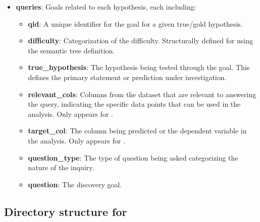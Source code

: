 \begin{itemize}
    \item \textbf{queries}: Goals related to each hypothesis, each including:
    \begin{itemize}
        \item \textbf{qid}: A unique identifier for the goal for a given true/gold hypothesis.
        \item \textbf{difficulty}: Categorization of the difficulty. Structurally defined for \synth{} using the semantic tree definition.
        \item \textbf{true\_hypothesis}: The hypothesis being tested through the goal. This defines the primary statement or prediction under investigation.
        \item \textbf{relevant\_cols}: Columns from the dataset that are relevant to answering the query, indicating the specific data points that can be used in the analysis. Only appears for \synth{}.
        \item \textbf{target\_col}: The column being predicted or the dependent variable in the analysis. Only appears for \synth{}.
        \item \textbf{question\_type}: The type of question being asked categorizing the nature of the inquiry.
        \item \textbf{question}: The discovery goal.
    \end{itemize}
\end{itemize}



\subsection{Directory structure for \real{}}


